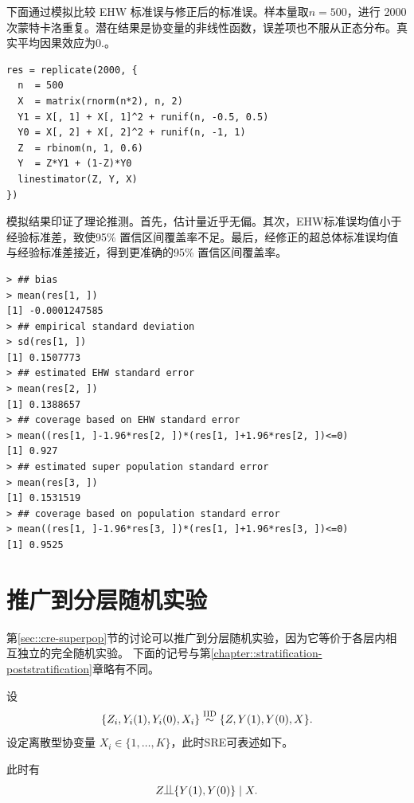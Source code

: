 下面通过模拟比较 EHW 标准误与修正后的标准误。样本量取$n=500$，进行 2000 次蒙特卡洛重复。潜在结果是协变量的非线性函数，误差项也不服从正态分布。真实平均因果效应为$0.$。
\begin{lstlisting}
res = replicate(2000, {
  n  = 500
  X  = matrix(rnorm(n*2), n, 2)
  Y1 = X[, 1] + X[, 1]^2 + runif(n, -0.5, 0.5)
  Y0 = X[, 2] + X[, 2]^2 + runif(n, -1, 1)
  Z  = rbinom(n, 1, 0.6)
  Y  = Z*Y1 + (1-Z)*Y0
  linestimator(Z, Y, X)
})
\end{lstlisting}


模拟结果印证了理论推测。首先，\citet{lin2013}估计量近乎无偏。其次，EHW标准误均值小于经验标准差，致使95\% 置信区间覆盖率不足。最后，经修正的超总体标准误均值与经验标准差接近，得到更准确的95\% 置信区间覆盖率。
\begin{lstlisting}
> ## bias
> mean(res[1, ])
[1] -0.0001247585
> ## empirical standard deviation
> sd(res[1, ])
[1] 0.1507773
> ## estimated EHW standard error
> mean(res[2, ])
[1] 0.1388657
> ## coverage based on EHW standard error
> mean((res[1, ]-1.96*res[2, ])*(res[1, ]+1.96*res[2, ])<=0)
[1] 0.927
> ## estimated super population standard error
> mean(res[3, ])
[1] 0.1531519
> ## coverage based on population standard error
> mean((res[1, ]-1.96*res[3, ])*(res[1, ]+1.96*res[3, ])<=0)
[1] 0.9525
\end{lstlisting}

\section{推广到分层随机实验}

第\ref{sec::cre-superpop}节的讨论可以推广到分层随机实验，因为它等价于各层内相互独立的完全随机实验。 
下面的记号与第\ref{chapter::stratification-poststratification}章略有不同。 


设
$$
\{ Z_i,  Y_i(1), Y_i(0) ,  X_i  \}  \stackrel{\textup{IID}}{\sim} \{ Z,  Y(1), Y(0), X  \} .
$$ 
设定离散型协变量 $ X_i \in \{ 1,\ldots, K\}$，此时SRE可表述如下。


\begin{definition}
[超总体框架下的SRE]\label{def::sre-superpopulation}
此时有
$$
Z\ind\{  Y(1), Y(0) \} \mid   X  .
$$
\end{definition}


